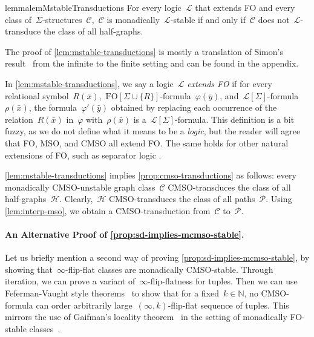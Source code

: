 \documentclass[11pt]{article}      \usepackage[margin=1in]{geometry}  \usepackage{microtype}
\theoremstyle{definition}
\newcommand{\N}[0]{\mathrm{\mathbb{N}}}
\renewcommand{\phi}{\varphi}
\newcommand{\LL}{\mathcal{L}}
\newcommand{\FO}{\mathrm{FO}}
\newcommand{\CC}{\mathcal{C}}
\newcommand{\PP}{\mathcal{P}}
\begin{document}
\begin{restatable}{lemma}{lemMstableTransductions}
\label{lem:mstable-transductions}
    For every logic~$\LL$ that extends FO and every class of~$\Sigma$-structures~$\CC$,~$\CC$ is monadically~$\LL$-stable if and only if~$\CC$ does not~$\LL$-transduce the class of all half-graphs.
\end{restatable}

The proof of \cref{lem:mstable-transductions} is mostly a translation of Simon's result~\cite{simon2021note} from the infinite to the finite setting and can be found in the appendix.

In \cref{lem:mstable-transductions}, we say a logic~$\LL$ \emph{extends FO} if for every relational symbol~$R(\bar x)$,~$\FO[\Sigma \cup \{ R \}]$-formula~$\phi(\bar y)$, and~$\LL[\Sigma]$-formula~$\rho(\bar x)$, the formula~$\phi'(\bar y)$ obtained by replacing each occurrence of the relation~$R(\bar x)$ in~$\phi$ with~$\rho(\bar x)$ is a~$\LL[\Sigma]$-formula.
This definition is a bit fuzzy, as we do not define what it means to be a \emph{logic}, but the reader will agree that FO, MSO, and CMSO all extend FO. The same holds for other natural extensions of FO, such as separator logic \cite{schirrmacher23,bojanczyk2021separator}.

\cref{lem:mstable-transductions} implies \cref{prop:cmso-transductions} as follows: every monadically CMSO-unstable graph class~$\CC$ CMSO-transduces the class of all half-graphs~$\mathcal{H}$.
Clearly,~$\mathcal{H}$ CMSO-transduces the class of all paths~$\PP$. Using \cref{lem:interp-mso}, we obtain a CMSO-transduction from~$\CC$ to~$\PP$.



\paragraph*{An Alternative Proof of \cref{prop:sd-implies-mcmso-stable}.}
Let us briefly mention a second way of proving \cref{prop:sd-implies-mcmso-stable}, by showing that~$\infty$-flip-flat classes are monadically CMSO-stable.
Through iteration, we can prove a variant of~$\infty$-flip-flatness for tuples.
Then we can use Feferman-Vaught style theorems~\cite{MAKOWSKY2004159} to show that for a fixed~$k\in\N$, no CMSO-formula can order arbitrarily large~$(\infty,k)$-flip-flat sequence of tuples. 
This mirrors the use of Gaifman's locality theorem~\cite{gaifman82} in the setting of monadically FO-stable classes~\cite{dreier2022indiscernibles}.
\end{document}
